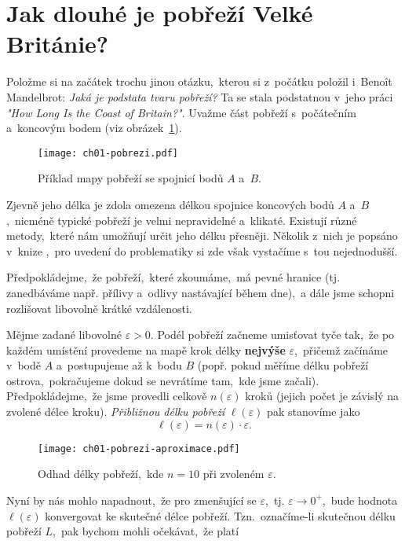 \section{Jak dlouhé je pobřeží Velké Británie?}\label{sec:pobrezi_velke_britanie}
Položme si na začátek trochu jinou otázku,~kterou si z~počátku položil i~Benoît Mandelbrot: \emph{Jaká je podstata tvaru pobřeží?} Ta se stala podstatnou v~jeho práci \emph{"How Long Is the Coast of Britain?"}. Uvažme část pobřeží s~počátečním a~koncovým bodem (viz obrázek~\ref{fig:pobrezi}).
\begin{figure}[h]
    \centering
    \texttt{[image: ch01-pobrezi.pdf]}
    \caption{Příklad mapy pobřeží se spojnicí bodů $A$ a~$B$.}
    \label{fig:pobrezi}
\end{figure}
Zjevně jeho délka je zdola omezena délkou spojnice koncových bodů $A$ a~$B$,~nicméně typické pobřeží je velmi nepravidelné a~klikaté. Existují různé metody,~které nám umožňují určit jeho délku přesněji. Několik z~nich je popsáno v~knize \citep[str. 79]{Mandelbrot1983},~pro uvedení do problematiky si zde však vystačíme s~tou nejednodušší.\par
Předpokládejme,~že pobřeží,~které zkoumáme,~má pevné hranice (tj. zanedbáváme např. přílivy a~odlivy nastávající během dne),~a dále jsme schopni rozlišovat libovolně krátké vzdálenosti.\par
Mějme zadané libovolné $\varepsilon>0$. Podél pobřeží začneme umisťovat tyče tak,~že po každém umístění provedeme na mapě krok délky \textbf{nejvýše} $\varepsilon$,~přičemž začínáme v~bodě $A$ a~postupujeme až k~bodu $B$ (popř. pokud měříme délku pobřeží ostrova,~pokračujeme dokud se nevrátíme tam,~kde jsme začali). Předpokládejme,~že jsme provedli celkově $n(\varepsilon)$ kroků (jejich počet je závislý na zvolené délce kroku). \emph{Přibližnou délku pobřeží} $\ell(\varepsilon)$ pak stanovíme jako
\begin{equation*}
    \ell(\varepsilon)=n(\varepsilon)\cdot\varepsilon.
\end{equation*}
\begin{figure}[h]
    \centering
    \texttt{[image: ch01-pobrezi-aproximace.pdf]}
    \caption{Odhad délky pobřeží,~kde $n=10$ při zvoleném $\varepsilon$.}
    \label{fig:pobrezi_aproximace}
\end{figure}
Nyní by nás mohlo napadnout,~že pro zmenšující se $\varepsilon$,~tj. $\varepsilon\to0^+$,~bude hodnota $\ell(\varepsilon)$ konvergovat ke skutečné délce pobřeží. Tzn.~označíme-li skutečnou délku pobřeží $L$,~pak bychom mohli očekávat,~že platí
